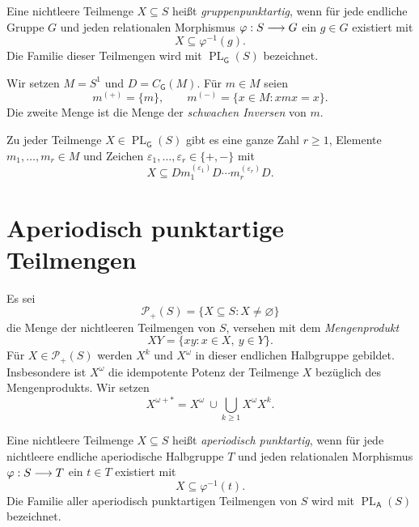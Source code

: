 \begin{definition}
Eine nichtleere Teilmenge $X\subseteq S$ heißt \emph{gruppenpunktartig},
wenn für jede endliche Gruppe $G$ und jeden relationalen Morphismus
$\varphi:S\relbar\joinrel\to G$ ein $g\in G$ existiert mit
\[
 X\subseteq\varphi^{-1}(g).
\]
Die Familie dieser Teilmengen wird mit
$\operatorname{PL}_{\mathsf G}(S)$ bezeichnet.
\end{definition}

\begin{definition}
Wir setzen $M=S^1$ und $D=C_{\mathsf G}(M)$.
Für $m\in M$ seien
\[
 m^{(+)}=\{m\},\qquad
 m^{(-)}=\{x\in M:xmx=x\}.
\]
Die zweite Menge ist die Menge der \emph{schwachen Inversen} von $m$.
\end{definition}

\begin{theorem}
\label{thm:b37-guide-group-pointlikes}
Zu jeder Teilmenge $X\in\operatorname{PL}_{\mathsf G}(S)$ gibt es
eine ganze Zahl $r\geq1$, Elemente $m_1,\ldots,m_r\in M$ und Zeichen
$\varepsilon_1,\ldots,\varepsilon_r\in\{+,-\}$ mit
\[
 X\subseteq Dm_1^{(\varepsilon_1)}D\cdots
                 m_r^{(\varepsilon_r)}D.
\]
\cite[Satz~1.2]{HenckellMargolisPinRhodes1991}
\end{theorem}

\clearpage
\section{Aperiodisch punktartige Teilmengen}

\begin{definition}
\label{def:b37-guide-power-subsets}
Es sei
\[
 \mathcal P_+(S)=\{X\subseteq S:X\ne\varnothing\}
\]
die Menge der nichtleeren Teilmengen von $S$, versehen mit dem
\emph{Mengenprodukt}
\[
 XY=\{xy:x\in X,\ y\in Y\}.
\]
Für $X\in\mathcal P_+(S)$ werden $X^k$ und $X^\omega$ in dieser
endlichen Halbgruppe gebildet. Insbesondere ist $X^\omega$ die
idempotente Potenz der Teilmenge $X$ bezüglich des Mengenprodukts.
Wir setzen
\[
 X^{\omega+*}=X^\omega\ \cup\!\bigcup_{k\geq1}X^\omega X^k.
\]
\end{definition}

\begin{definition}
\label{def:b37-guide-aperiodic-pointlike}
Eine nichtleere Teilmenge $X\subseteq S$ heißt
\emph{aperiodisch punktartig}, wenn für jede nichtleere endliche
aperiodische Halbgruppe $T$ und jeden relationalen Morphismus
$\varphi:S\relbar\joinrel\to T$ ein $t\in T$ existiert mit
\[
 X\subseteq\varphi^{-1}(t).
\]
Die Familie aller aperiodisch punktartigen Teilmengen von $S$
wird mit $\operatorname{PL}_{\mathsf A}(S)$ bezeichnet.
\end{definition}

